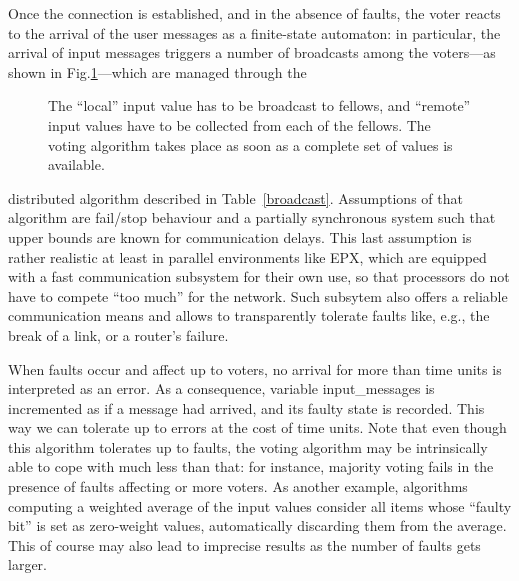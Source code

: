 \documentclass[11pt]{article}
\begin{document}
Once the connection is established, and in the absence of faults,
the voter reacts to the arrival of 
the user messages as a finite-state automaton: in particular, the arrival of
input messages triggers a number of broadcasts among the voters---as shown
in Fig.\ref{vf}---which are managed through the 
\begin{figure}
\centerline{}
\caption{The ``local'' input value has to be broadcast to  fellows,
and  ``remote'' input values have to be collected from each of the
fellows. The voting algorithm takes place as soon as a complete set of values is
available.}\label{vf}
\end{figure}
distributed algorithm described in Table~\ref{broadcast}.
Assumptions of that algorithm are fail/stop behaviour and a partially
synchronous system such that upper bounds are known for communication delays.
This last assumption is rather realistic at least in parallel environments like EPX,
which are equipped with a fast communication subsystem for their own use,
so that processors do not have to compete ``too much'' for the network.
Such subsytem also offers a reliable communication means and allows to transparently tolerate 
faults like, e.g., the break of a link, or a router's failure.

When faults occur and affect up to  voters,
no arrival for more than  time units is interpreted
as an error. As a consequence, 
variable {\sf input\_messages} is incremented as if a message
had arrived, and its faulty state is recorded. This way we can tolerate
up to  errors at the cost of  time units.
Note that even though this algorithm tolerates up to  faults,
the voting algorithm may be intrinsically able to cope with much less than that:
for instance, majority voting fails in the presence of faults affecting
 or more voters. As another example, algorithms computing
a weighted average of the input values consider all items
whose ``faulty bit'' is set as zero-weight values, automatically
discarding them from the average. This of course may also lead to
imprecise results as the number of faults gets larger.
\end{document}
